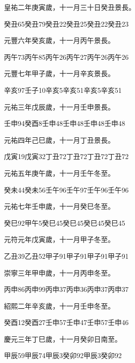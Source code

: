 \begin{pinyinscope}
 皇祐二年庚寅歲，十一月三十日癸丑景長。



 癸丑65癸丑79癸丑22癸丑25癸丑22癸丑23



 元豐六年癸亥歲，十一月丙午景長。



 丙午73丙午85丙午26丙午27丙午26丙午26



 元豐七年甲子歲，十一月辛亥景長。



 辛亥97壬子10辛亥5辛亥51辛亥5辛亥51



 元祐三年戊辰歲，十一月壬申景長。



 壬申94癸酉8壬申48壬申48壬申48壬申48



 元祐四年己巳歲，十一月丁丑景長。



 戊寅19戊寅32丁丑72丁丑72丁丑72丁丑72



 元祐五年庚午歲，十一月壬午冬至。



 癸未44癸未56壬午96壬午97壬午96壬午96



 元祐七年壬申歲，十一月癸巳冬至。



 癸巳92甲午5癸巳45癸巳45癸巳45癸巳45



 元符元年戊寅歲，十一月甲子冬至。



 乙丑39乙丑52甲子91甲子91甲子91甲子91



 崇寧三年甲申歲，十一月丙申冬至。



 丙申86丙申99丙申37丙申36丙申37丙申37



 紹熙二年辛亥歲，十一月壬申冬至。



 癸酉12癸酉27壬申57壬申47壬申57壬申46



 慶元三年丁巳歲，十一月癸卯日南至。



 甲辰59甲辰74甲辰3癸卯92甲辰3癸卯92




\end{pinyinscope}
